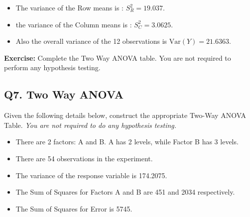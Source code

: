 \documentclass[a4paper,12pt]{article}
\begin{document}
\begin{itemize}
	\item The variance of the Row means is : $S^2_{R} = 19.037$. 
	\item the variance of the Column means is : $S^2_{C} = 3.0625$.	
	\item Also the overall variance of the 12 observations is $\textrm{Var}(Y) = 21.6363 $. 
\end{itemize}

\noindent \textbf{Exercise:} Complete the Two Way ANOVA table. You are not required to perform any hypothesis testing.
\newpage

\subsection*{Q7. Two Way ANOVA }
Given the following details below, construct the appropriate Two-Way ANOVA Table. \textit{You are not required to do any hypothesis testing.}

\begin{itemize}
	\item There are 2 factors: A and B. A has 2 levels, while Factor B has 3 levels.
	\item There are 54 observations in the experiment.
	\item The variance of the response variable is 174.2075.
	\item The Sum of Squares for Factors A and B are 451  and  2034 respectively.
	\item The Sum of Squares for Error is 5745.
\end{itemize}

\newpage
\end{document}
